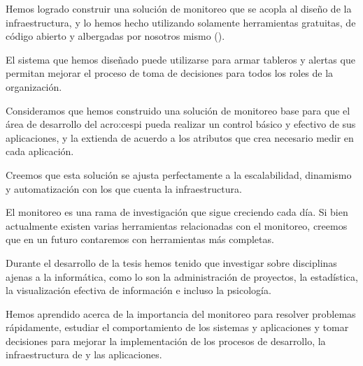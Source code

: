 Hemos logrado construir una solución de monitoreo que se acopla al diseño de la
infraestructura, y lo hemos hecho utilizando solamente herramientas gratuitas,
de código abierto y albergadas por nosotros mismo ().

El sistema que hemos diseñado puede utilizarse para armar tableros y alertas
que permitan mejorar el proceso de toma de decisiones para todos los roles de
la organización.

Consideramos que hemos construido una solución de monitoreo base para que el
área de desarrollo del \gls{acro:cespi} pueda realizar un control básico y
efectivo de sus aplicaciones, y la extienda de acuerdo a los atributos que crea
necesario medir en cada aplicación.

Creemos que esta solución se ajusta perfectamente a la escalabilidad, dinamismo
y automatización con los que cuenta la infraestructura.

El monitoreo es una rama de investigación que sigue creciendo cada día. Si bien
actualmente existen varias herramientas relacionadas con el monitoreo, creemos
que en un futuro contaremos con herramientas más completas.

Durante el desarrollo de la tesis hemos tenido que investigar sobre disciplinas
ajenas a la informática, como lo son la administración de proyectos, la
estadística, la visualización efectiva de información e incluso la psicología.

Hemos aprendido acerca de la importancia del monitoreo para resolver problemas
rápidamente, estudiar el comportamiento de los sistemas y aplicaciones y tomar
decisiones para mejorar la implementación de los procesos de desarrollo, la
infraestructura de  y las aplicaciones.
